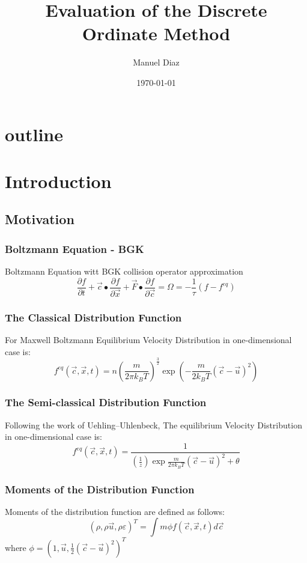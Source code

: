 \documentclass[11pt,fleqn]{beamer}
\title{Evaluation of the  Discrete Ordinate Method}
\author{Manuel Diaz}
\date{\today}
\begin{document}
\begin{frame}
	\titlepage
\end{frame}

\section*{outline}
\begin{frame}
	\tableofcontents
\end{frame}

\section{Introduction}
\subsection{Motivation}

\begin{frame}
	\frametitle{Boltzmann Equation - BGK}
	Boltzmann Equation witt BGK collision operator approximation 
	\begin{equation}
	\frac{\partial{f}}{\partial{t}} +
	\vec{c}\bullet\frac{\partial{f}}{\partial{\vec{x}}} +
	\vec{F}\bullet\frac{\partial{f}}{\partial{\vec{c}}} = 
	\Omega = -\frac{1}{\tau}(f-f^{eq})
	\end{equation}
\end{frame}

\begin{frame}
	\frametitle{The Classical Distribution Function}
	For Maxwell Boltzmann Equilibrium Velocity Distribution in one-dimensional case is:
	\begin{equation}
	f^{eq}(\vec{c},\vec{x},t) = n\left(\frac{m}{2\pi k_B T}\right)^{\frac{3}{2}}\exp \left( -\frac{m}{2 k_B T}(\vec{c}-\vec{u})^2 \right)
	\end{equation}
\end{frame}

\begin{frame}
	\frametitle{The Semi-classical Distribution Function}
	Following the work of Uehling–Uhlenbeck, The equilibrium Velocity Distribution in one-dimensional case is:
	\begin{equation}
	f^{eq}(\vec{c},\vec{x},t)=\frac{1}{(\frac{1}{z})\exp{\frac{m}{2\pi k_B T}(\vec{c}-\vec{u})^2}+\theta}
	\end{equation}
\end{frame}

\begin{frame}
	\frametitle{Moments of the Distribution Function}
	Moments of the distribution function are defined as follows:
	\begin{equation}
	(\rho,\rho \vec{u},\rho\varepsilon)^T = \int m\phi f(\vec{c},\vec{x},t) d\vec{c} 
	\end{equation}
	where $ \phi =  (1,\vec{u},\frac{1}{2}(\vec{c}-\vec{u})^2)^T $
\end{frame}
\end{document}
